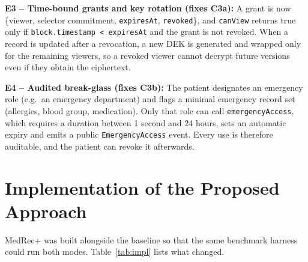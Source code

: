 \documentclass[11pt,a4paper]{article}
\begin{document}
\textbf{E3 -- Time-bound grants and key rotation (fixes C3a):} A grant is now
\{viewer, selector commitment, \texttt{expiresAt}, \texttt{revoked}\}, and
\texttt{canView} returns true only if \texttt{block.timestamp < expiresAt} and the
grant is not revoked. When a record is updated after a revocation, a new DEK is
generated and wrapped only for the remaining viewers, so a revoked viewer cannot
decrypt future versions even if they obtain the ciphertext.

\textbf{E4 -- Audited break-glass (fixes C3b):} The patient designates an emergency
role (e.g.\ an emergency department) and flags a minimal emergency record set
(allergies, blood group, medication). Only that role can call
\texttt{emergencyAccess}, which requires a duration between 1 second and 24 hours,
sets an automatic expiry and emits a public \texttt{EmergencyAccess} event. Every
use is therefore auditable, and the patient can revoke it afterwards.


\section{Implementation of the Proposed Approach}
MedRec+ was built alongside the baseline so that the same benchmark harness could
run both modes. Table~\ref{tab:impl} lists what changed.
\end{document}
